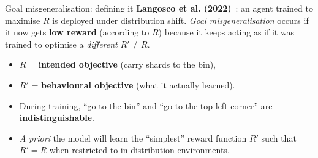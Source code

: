 \begin{frame}{Goal misgeneralisation: defining it}
\textbf{Langosco et al. (2022)}~: an agent trained to maximise $R$ is deployed 
under distribution shift. \emph{Goal misgeneralisation} occurs if it now gets \textbf{low reward} 
(according to $R$) because it keeps acting as if it was trained to optimise a \emph{different} $R' \neq R$.
\begin{itemize}
  \item $R$ = \textbf{intended objective} (carry shards to the bin),
  \item $R'$ = \textbf{behavioural objective} (what it actually learned).
\end{itemize}
\begin{itemize}
\item During training, ``go to the bin'' and ``go to the top-left corner'' are \textbf{indistinguishable}. 
\item \emph{A priori} the model will learn the ``simplest'' reward function $R'$ such that $R'=R$ when
restricted to in-distribution environments. 
\end{itemize}
\end{frame}


